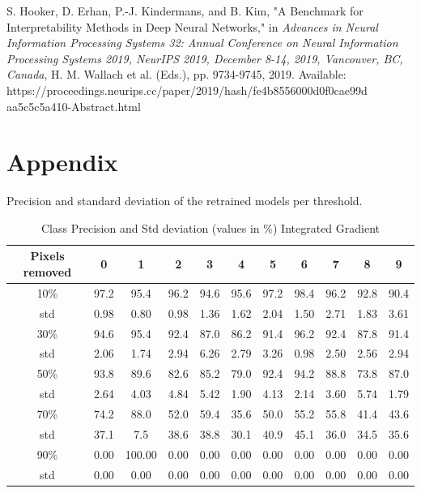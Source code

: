 \documentclass[conference]{IEEEtran}
\begin{document}
\begin{thebibliography}{00}
 S. Hooker, D. Erhan, P.-J. Kindermans, and B. Kim, "A Benchmark for Interpretability Methods in Deep Neural Networks," in \textit{Advances in Neural Information Processing Systems 32: Annual Conference on Neural Information Processing Systems 2019, NeurIPS 2019, December 8-14, 2019, Vancouver, BC, Canada}, H. M. Wallach et al. (Eds.), pp. 9734-9745, 2019. Available: https://proceedings.neurips.cc/paper/2019/hash/fe4b8556000d0f0cae99d\\aa5c5c5a410-Abstract.html












\end{thebibliography}
\onecolumn
\newpage



\section{Appendix}
\centering
Precision and standard deviation of the retrained models per threshold.

\begin{table}[h]
	\centering
	\begin{tabular}{|c|c|c|c|c|c|c|c|c|c|c|}
		\hline
		
		Pixels removed & 0 & 1 & 2 & 3 & 4 & 5 & 6 & 7 & 8 & 9 \\
		\hline
		10\%& 97.2 & 95.4 & 96.2 & 94.6 & 95.6 & 97.2 & 98.4 & 96.2 & 92.8 & 90.4 \\
		std & 0.98 & 0.80 & 0.98 & 1.36 & 1.62 & 2.04 & 1.50 & 2.71 & 1.83 & 3.61 \\
		\hline
		30\% &  94.6 & 95.4 & 92.4 & 87.0 & 86.2 & 91.4 & 96.2 & 92.4 & 87.8 & 91.4 \\
		std & 2.06 & 1.74 & 2.94 & 6.26 & 2.79 & 3.26 & 0.98 & 2.50 & 2.56 & 2.94 \\
		\hline
		50\% &93.8 & 89.6 & 82.6 & 85.2 & 79.0 & 92.4 & 94.2 & 88.8 & 73.8 & 87.0  \\
		std & 2.64 & 4.03 & 4.84 & 5.42 & 1.90 & 4.13 & 2.14 & 3.60 & 5.74 & 1.79 \\
		\hline
		70\% & 74.2 & 88.0 & 52.0 & 59.4 & 35.6 & 50.0 & 55.2 & 55.8 & 41.4 & 43.6  \\
		std & 37.1 & 7.5 & 38.6 & 38.8 & 30.1 & 40.9 & 45.1 & 36.0 & 34.5 & 35.6 \\
		\hline
		90\% & 0.00 & 100.00 & 0.00 & 0.00 & 0.00 & 0.00 & 0.00 & 0.00 & 0.00 & 0.00  \\
		std & 0.00 & 0.00 & 0.00 & 0.00 & 0.00 & 0.00 & 0.00 & 0.00 & 0.00 & 0.00 \\
		\hline
	\end{tabular} \newline
	
	\caption{Class Precision and Std deviation (values in \%) Integrated Gradient}
	\label{tab:sclass_precision_ig}
\end{table}
\end{document}
